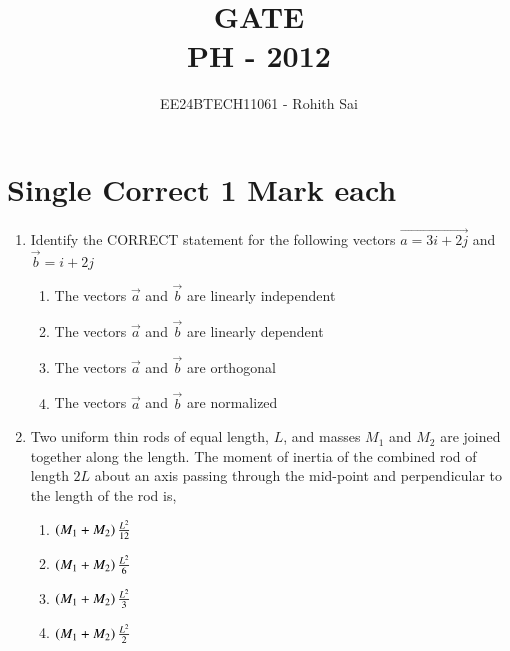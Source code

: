 \documentclass[journal]{IEEEtran}
\begin{document}

\vspace{3cm}

\title{GATE\\PH - 2012}
\author{EE24BTECH11061 - Rohith Sai}
\maketitle

\renewcommand{\thefigure}{\theenumi}
\renewcommand{\thetable}{\theenumi}

\section*{Single Correct 1 Mark each}
\begin{enumerate}
\item Identify the CORRECT statement for the following vectors $\vec{a = 3i+ 2j}$ and $\vec{b} = i + 2j$
\begin{multicols}{2}
    \begin{enumerate}
        \item The vectors $\vec{a}$ and $\vec{b}$ are linearly independent
        \item The vectors $\vec{a}$ and $\vec{b}$ are linearly dependent
        \item The vectors $\vec{a}$ and $\vec{b}$ are orthogonal
        \item The vectors $\vec{a}$ and $\vec{b}$ are normalized
    \end{enumerate}
\end{multicols}

\item Two uniform thin rods of equal length, $L$, and masses $M_1$ and $M_2$ are joined together along the
length. The moment of inertia of the combined rod of length $2L$ about an axis passing through the
mid-point and perpendicular to the length of the rod is,
\begin{multicols}{2}
    \begin{enumerate}
        \item $\left(M_1 + M_2\right)\frac{L^2}{12}$
        \item $\left(M_1 + M_2\right)\frac{L^2}{6}$
        \item $\left(M_1 + M_2\right)\frac{L^2}{3}$
        \item $\left(M_1 + M_2\right)\frac{L^2}{2}$
    \end{enumerate}
\end{multicols}
    

\end{enumerate}
\end{document}
